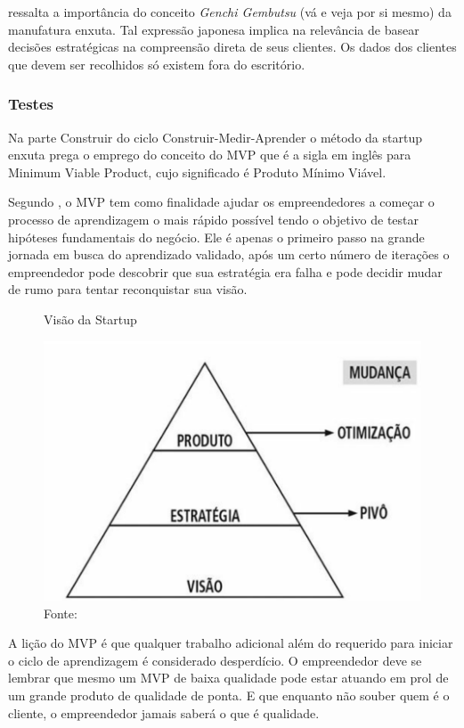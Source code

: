  ressalta a importância do conceito \textit {Genchi Gembutsu} (vá e veja por si mesmo) da manufatura enxuta. Tal expressão japonesa implica na relevância de basear decisões estratégicas na compreensão direta de seus clientes. Os dados dos clientes que devem ser recolhidos só existem fora do escritório.

\subsubsection{Testes}
\label{cha:testes}

Na parte Construir do ciclo Construir-Medir-Aprender o método da startup enxuta prega o emprego do conceito do MVP que é a sigla em inglês para Minimum Viable Product, cujo significado é Produto Mínimo Viável.

Segundo , o MVP tem como finalidade ajudar os empreendedores a começar o processo de aprendizagem o mais rápido possível tendo o objetivo de testar hipóteses fundamentais do negócio. Ele é apenas o primeiro passo na grande jornada em busca do aprendizado validado, após um certo número de iterações o empreendedor pode descobrir que sua estratégia era falha e pode decidir mudar de rumo para tentar reconquistar sua visão.

\begin{figure}[H]
\caption{Visão da Startup}
\centerline{\includegraphics[scale=0.2]{img/pivotar}}
\label{fig:pivotar}
\caption* {Fonte: }
\end{figure}

A lição do MVP é que qualquer trabalho adicional além do requerido para iniciar o ciclo de aprendizagem é considerado desperdício. O empreendedor deve se lembrar que mesmo um MVP de baixa qualidade pode estar atuando em prol de um grande produto de qualidade de ponta. E que enquanto não souber quem é o cliente, o empreendedor jamais saberá o que é qualidade. \cite{leanstartup}

